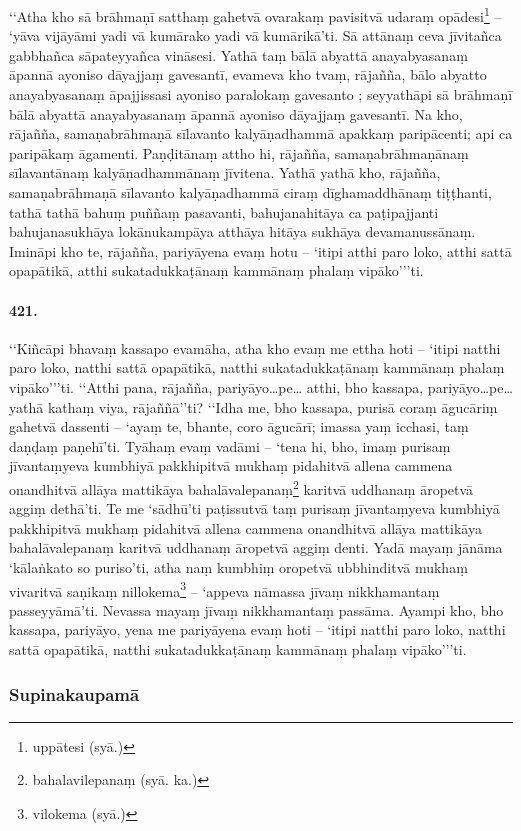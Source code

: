 ‘‘Atha kho sā brāhmaṇī satthaṃ gahetvā ovarakaṃ pavisitvā udaraṃ opādesi\footnote{uppātesi (syā.)} – ‘yāva vijāyāmi yadi vā kumārako yadi vā kumārikā’ti. Sā attānaṃ ceva jīvitañca gabbhañca sāpateyyañca vināsesi. Yathā taṃ bālā abyattā anayabyasanaṃ āpannā ayoniso dāyajjaṃ gavesantī, evameva kho tvaṃ, rājañña, bālo abyatto anayabyasanaṃ āpajjissasi ayoniso paralokaṃ gavesanto ; seyyathāpi sā brāhmaṇī bālā abyattā anayabyasanaṃ āpannā ayoniso dāyajjaṃ gavesantī. Na kho, rājañña, samaṇabrāhmaṇā sīlavanto kalyāṇadhammā apakkaṃ paripācenti; api ca paripākaṃ āgamenti. Paṇḍitānaṃ attho hi, rājañña, samaṇabrāhmaṇānaṃ sīlavantānaṃ kalyāṇadhammānaṃ jīvitena. Yathā yathā kho, rājañña, samaṇabrāhmaṇā sīlavanto kalyāṇadhammā ciraṃ dīghamaddhānaṃ tiṭṭhanti, tathā tathā bahuṃ puññaṃ pasavanti, bahujanahitāya ca paṭipajjanti bahujanasukhāya lokānukampāya atthāya hitāya sukhāya devamanussānaṃ. Imināpi kho te, rājañña, pariyāyena evaṃ hotu – ‘itipi atthi paro loko, atthi sattā opapātikā, atthi sukatadukkaṭānaṃ kammānaṃ phalaṃ vipāko’’’ti.

\paragraph{421.} ‘‘Kiñcāpi bhavaṃ kassapo evamāha, atha kho evaṃ me ettha hoti – ‘itipi natthi paro loko, natthi sattā opapātikā, natthi sukatadukkaṭānaṃ kammānaṃ phalaṃ vipāko’’’ti. ‘‘Atthi pana, rājañña, pariyāyo…pe… atthi, bho kassapa, pariyāyo…pe… yathā kathaṃ viya, rājaññā’’ti? ‘‘Idha me, bho kassapa, purisā coraṃ āgucāriṃ gahetvā dassenti – ‘ayaṃ te, bhante, coro āgucārī; imassa yaṃ icchasi, taṃ daṇḍaṃ paṇehī’ti. Tyāhaṃ evaṃ vadāmi – ‘tena hi, bho, imaṃ purisaṃ jīvantaṃyeva kumbhiyā pakkhipitvā mukhaṃ pidahitvā allena cammena onandhitvā allāya mattikāya bahalāvalepanaṃ\footnote{bahalavilepanaṃ (syā. ka.)} karitvā uddhanaṃ āropetvā aggiṃ dethā’ti. Te me ‘sādhū’ti paṭissutvā taṃ purisaṃ jīvantaṃyeva kumbhiyā pakkhipitvā mukhaṃ pidahitvā allena cammena onandhitvā allāya mattikāya bahalāvalepanaṃ karitvā uddhanaṃ āropetvā aggiṃ denti. Yadā mayaṃ jānāma ‘kālaṅkato so puriso’ti, atha naṃ kumbhiṃ oropetvā ubbhinditvā mukhaṃ vivaritvā saṇikaṃ nillokema\footnote{vilokema (syā.)} – ‘appeva nāmassa jīvaṃ nikkhamantaṃ passeyyāmā’ti. Nevassa mayaṃ jīvaṃ nikkhamantaṃ passāma. Ayampi kho, bho kassapa, pariyāyo, yena me pariyāyena evaṃ hoti – ‘itipi natthi paro loko, natthi sattā opapātikā, natthi sukatadukkaṭānaṃ kammānaṃ phalaṃ vipāko’’’ti.

\subsubsection{Supinakaupamā}

